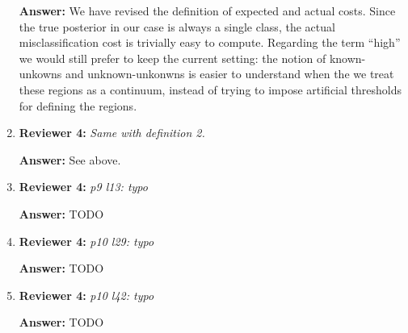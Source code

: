 \documentclass[letterpaper]{article}
\begin{document}
\begin{enumerate}
\textbf{Answer:} We have revised the definition of expected and actual costs. Since the true posterior in our case is always a single class, the actual misclassification cost is trivially easy to compute. Regarding the term ``high'' we would still prefer to keep the current setting: the notion of known-unkowns and unknown-unkonwns is easier to understand when the we treat these regions as a continuum, instead of trying to impose artificial thresholds for defining the regions.

\item \textbf{Reviewer 4:} \emph{ Same with definition 2.}

\textbf{Answer:} See above.

\item \textbf{Reviewer 4:} \emph{ p9 l13: typo}

\textbf{Answer:} TODO

\item \textbf{Reviewer 4:} \emph{ p10 l29: typo}

\textbf{Answer:} TODO

\item \textbf{Reviewer 4:} \emph{ p10 l42: typo}

\textbf{Answer:} TODO



\end{enumerate}
\end{document}
